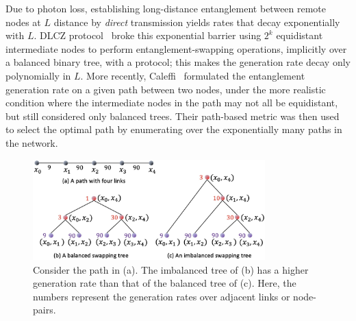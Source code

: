 Due to photon loss, establishing long-distance entanglement between remote
nodes at $L$ distance by \textit{direct} 
transmission yields \eps rates that decay exponentially with $L$. 
DLCZ protocol~\cite{dlcz,gisin} broke this exponential barrier using
$2^k$ equidistant intermediate nodes to perform entanglement-swapping operations, 
implicitly over a balanced binary tree, with a \wt protocol; this makes the 
\eps generation rate decay only polynomially in $L$. 
More recently, Caleffi~\cite{caleffi} formulated the entanglement generation rate on a given path between two nodes, under the more realistic condition where the intermediate nodes in the path may not all be equidistant, but still considered only balanced trees. Their path-based metric
was then used to select the optimal path by enumerating over the 
exponentially many paths in the network.

\begin{figure}
    \centering
    \includegraphics[width=0.8\textwidth]{chapters/swappingtrees/figures/non-balanced-balanced.jpg}
    \caption{Consider the path in (a). The imbalanced tree of (b) has a higher \eps generation rate than that of the balanced tree of (c). Here, the numbers represent the \eps generation rates over adjacent links or node-pairs.} 
    \label{fig:swapping_non-balance}
\end{figure}


